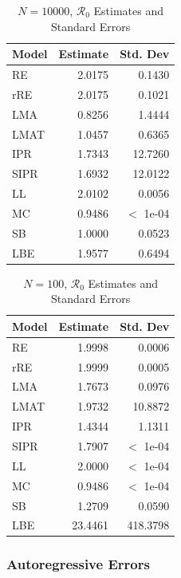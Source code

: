 \documentclass[12pt]{article}
\newcommand{\rr}{\ensuremath{\mathcal{R}_0}}
\begin{document}
\begin{table}[H]
	
	\centering
	\begin{tabular}[t]{l|r|r}
		\hline
		Model & Estimate & Std. Dev\\
		\hline
		RE & 2.0175 & 0.1430\\
		\hline
		rRE & 2.0175 & 0.1021\\
		\hline
		LMA & 0.8256 & 1.4444\\
		\hline
		LMAT & 1.0457 & 0.6365\\
		\hline
		IPR & 1.7343 & 12.7260\\
		\hline
		SIPR & 1.6932 & 12.0122\\
		\hline
		LL & 2.0102 & 0.0056\\
		\hline
		MC & 0.9486 & $<$ 1e-04\\
		\hline
		SB & 1.0000 & 0.0523\\
		\hline
		LBE & 1.9577 & 0.6494\\
		\hline
	\end{tabular}
	\caption{$N = 10000$, $\rr$ Estimates and Standard Errors}
\end{table}

\begin{table}[H]
	
	\centering
	\begin{tabular}[t]{l|r|r}
		\hline
		Model & Estimate & Std. Dev\\
		\hline
		RE & 1.9998 & 0.0006\\
		\hline
		rRE & 1.9999 & 0.0005\\
		\hline
		LMA & 1.7673 & 0.0976\\
		\hline
		LMAT & 1.9732 & 10.8872\\
		\hline
		IPR & 1.4344 & 1.1311\\
		\hline
		SIPR & 1.7907 & $<$ 1e-04\\
		\hline
		LL & 2.0000 & $<$ 1e-04\\
		\hline
		MC & 0.9486 & $<$ 1e-04\\
		\hline
		SB & 1.2709 & 0.0590\\
		\hline
		LBE & 23.4461 & 418.3798\\
		\hline
	\end{tabular}
	\caption{$N = 100$, $\rr$ Estimates and Standard Errors}
\end{table}

\subsubsection{Autoregressive Errors}
\end{document}
